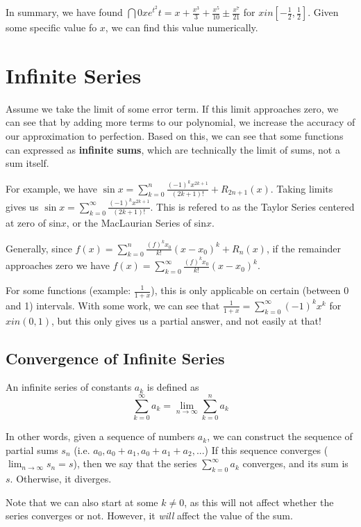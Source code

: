 \documentclass[12pt]{article}
\begin{document}
In summary, we have found $\dint{0}{x}{e^{t^2}}{t} = x + \frac{x^3}{3} + \frac{x^5}{10} \pm \frac{x^7}{21}$ for $x in [-\frac{1}{2},\frac{1}{2}]$. Given some specific value fo $x$, we can find this value numerically.

\section*{Infinite Series}
Assume we take the limit of some error term. If this limit approaches zero, we can see that by adding more terms to our polynomial, we increase the accuracy of our approximation to perfection. Based on this, we can see that some functions can expressed as {\bf infinite sums}, which are technically the limit of sums, not a sum itself.

For example, we have $\sin x = \displaystyle\sum_{k=0}^n \frac{(-1)^k x^{2k+1}}{(2k+1)!} + R_{2n+1}(x)$. Taking limits gives us $\sin x = \displaystyle\sum_{k=0}^\infty \frac{(-1)^k x^{2k+1}}{(2k+1)!}$. This is refered to as the Taylor Series centered at zero of sin$x$, or the MacLaurian Series of sin$x$.

Generally, since $f(x) = \displaystyle\sum_{k=0}^n \frac{(f)^k x_0}{k!}(x - x_0)^k + R_n(x)$, if the remainder approaches zero we have $f(x) = \displaystyle\sum_{k=0}^\infty \frac{(f)^k x_0}{k!}(x - x_0)^k$.

For some functions (example: $\frac{1}{1+x}$), this is only applicable on certain (between 0 and 1) intervals. With some work, we can see that $\frac{1}{1+x} = \displaystyle\sum_{k=0}^\infty (-1)^kx^k$ for $x in (0,1)$, but this only gives us a partial answer, and not easily at that!

\subsection*{Convergence of Infinite Series}
 An infinite series of constants $a_k$ is defined as \[ \sum_{k=0}^\infty a_k = \lim_{n\to\infty} \sum_{k=0}^n a_k \]

In other words, given a sequence of numbers $a_k$, we can construct the sequence of partial sums $s_n$ (i.e. $a_0, a_0 + a_1, a_0 + a_1 + a_2, ...$) If this sequence converges ($\lim_{n\to\infty} s_n = s$), then we say that the series $\displaystyle\sum_{k=0}^\infty a_k$ converges, and its sum is $s$. Otherwise, it diverges.

Note that we can also start at some $k \neq 0$, as this will not affect whether the series converges or not. However, it \emph{will} affect the value of the sum.
\end{document}
